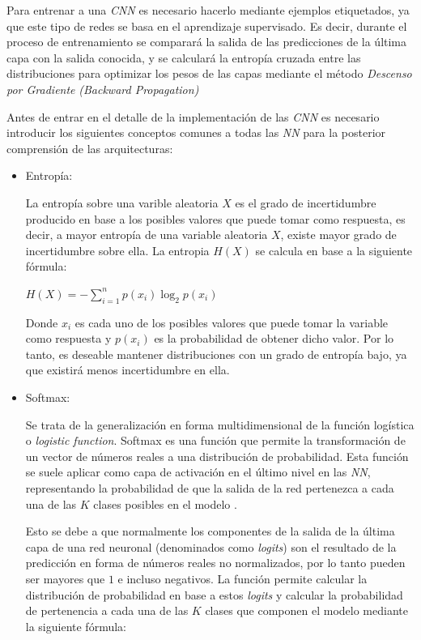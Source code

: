             Para entrenar a una \textit{CNN} es necesario hacerlo mediante ejemplos etiquetados, ya que este tipo de redes se basa en el aprendizaje supervisado. Es decir, durante el proceso de entrenamiento se comparará la salida de las predicciones de la última capa con la salida conocida, y se calculará la entropía cruzada entre las distribuciones  para optimizar los pesos de las capas mediante el método \textit{Descenso por Gradiente} \textit{(Backward Propagation)}


            Antes de entrar en el detalle de la implementación de las \textit{CNN} es necesario introducir los siguientes conceptos comunes a todas las \textit{NN} para la posterior comprensión de las arquitecturas:


            \begin{itemize}

                \item Entropía:

                    La entropía sobre una varible aleatoria $X$ es el grado de incertidumbre producido en base a los posibles valores que puede tomar como respuesta, es decir, a mayor entropía de una variable aleatoria $X$, existe mayor grado de incertidumbre sobre ella. La entropia $H(X)$ se calcula en base a la siguiente fórmula:

                    \begin{center}
                        $H(X) = -\sum_{i = 1}^n p(x_i) \log_2 p(x_i)$
                    \end{center}

                    Donde $x_i$ es cada uno de los posibles valores que puede tomar la variable como respuesta y $p(x_i)$ es la probabilidad de obtener dicho valor. Por lo tanto, es deseable mantener distribuciones con un grado de entropía bajo, ya que existirá menos incertidumbre en ella.


                \item Softmax:

                    Se trata de la generalización en forma multidimensional de la función logística o \textit{logistic function}. Softmax es una función que permite la transformación de un vector de números reales a una distribución de probabilidad. Esta función se suele aplicar como capa de activación en el último nivel en las \textit{NN}, representando la probabilidad de que la salida de la red pertenezca a cada una de las $K$ clases posibles en el modelo \cite{Softmax}. 

                    Esto se debe a que normalmente los componentes de la salida de la última capa de una red neuronal (denominados como \textit{logits}) son el resultado de la predicción en forma de números reales no normalizados, por lo tanto pueden ser mayores que $1$ e incluso negativos. La función permite calcular la distribución de probabilidad en base a estos \textit{logits} y calcular la probabilidad de pertenencia a cada una de las $K$ clases que componen el modelo mediante la siguiente fórmula:



\end{itemize}
